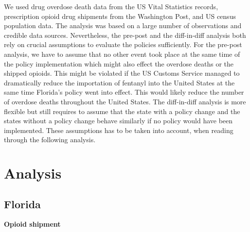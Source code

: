 \documentclass[12pt,letterpaper]{article}
\begin{document}
We used drug overdose death data from the US Vital Statistics records, prescription opioid drug shipments from the Washington Post, and US census population data. The analysis was based on a large number of observations and credible data sources. Nevertheless, the pre-post and the diff-in-diff analysis both rely on crucial assumptions to evaluate the policies sufficiently. For the pre-post analysis, we have to assume that no other event took place at the same time of the policy implementation which might also effect the overdose deaths or the shipped opioids. This might be violated if the US Customs Service managed to dramatically reduce the importation of fentanyl into the United States at the same time Florida’s policy went into effect. This would likely reduce the number of overdose deaths throughout the United States. The diff-in-diff analysis is more flexible but still requires to assume that the state with a policy change and the states without a policy change behave similarly if no policy would have been implemented. These assumptions has to be taken into account, when reading through the following analysis. 

\section{Analysis}
\subsection{Florida}

\textbf{Opioid shipment}
\end{document}
